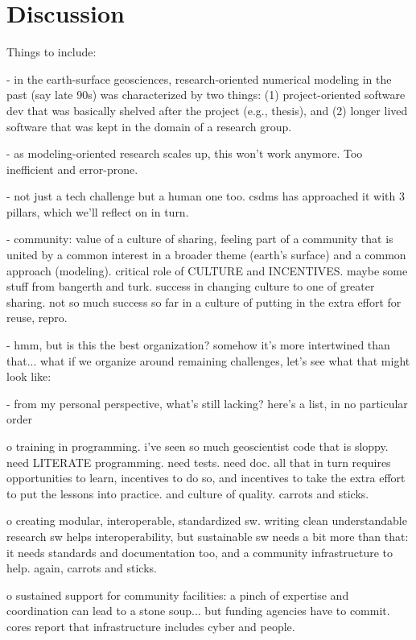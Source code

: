 \documentclass[12pt]{amsart}
\begin{document}
\section{Discussion}
\label{sec:discussion}

Things to include:

- in the earth-surface geosciences, research-oriented numerical modeling in the past (say late 90s) was characterized by two things: (1) project-oriented software dev that was basically shelved after the project (e.g., thesis), and (2) longer lived software that was kept in the domain of a research group. 

- as modeling-oriented research scales up, this won't work anymore. Too inefficient and error-prone.

- not just a tech challenge but a human one too. csdms has approached it with 3 pillars, which we'll reflect on in turn.

- community: value of a culture of sharing, feeling part of a community that is united by a common interest in a broader theme (earth's surface) and a common approach (modeling). critical role of CULTURE and INCENTIVES. maybe some stuff from bangerth and turk. success in changing culture to one of greater sharing. not so much success so far in a culture of putting in the extra effort for reuse, repro.

- hmm, but is this the best organization? somehow it's more intertwined than that... what if we organize around remaining challenges, let's see what that might look like:

- from my personal perspective, what's still lacking? here's a list, in no particular order

o training in programming. i've seen so much geoscientist code that is sloppy. need LITERATE programming. need tests. need doc. all that in turn requires opportunities to learn, incentives to do so, and incentives to take the extra effort to put the lessons into practice. and culture of quality. carrots and sticks.

o creating modular, interoperable, standardized sw. writing clean understandable research sw helps interoperability, but sustainable sw needs a bit more than that: it needs standards and documentation too, and a community infrastructure to help. again, carrots and sticks.

o sustained support for community facilities: a pinch of expertise and coordination can lead to a stone soup... but funding agencies have to commit. cores report that infrastructure includes cyber and people.
\end{document}
